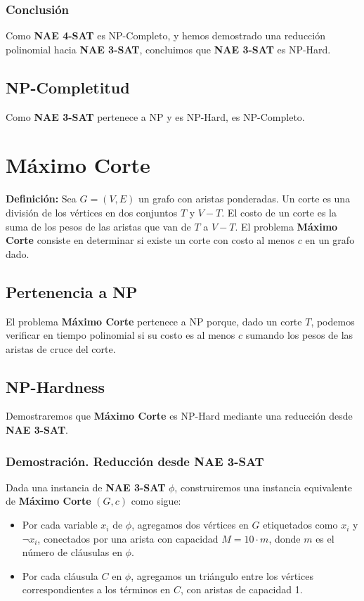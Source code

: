\documentclass[a4paper,12pt]{article}
\begin{document}
\subsubsection{Conclusi\'on}
Como \textbf{NAE 4-SAT} es NP-Completo, y hemos demostrado una reducci\'on polinomial hacia \textbf{NAE 3-SAT}, concluimos que \textbf{NAE 3-SAT} es NP-Hard. 

\subsection{NP-Completitud}
Como \textbf{NAE 3-SAT} pertenece a NP y es NP-Hard, es NP-Completo.

\section{Máximo Corte}

\textbf{Definici\'on:} Sea $G = (V, E)$ un grafo con aristas ponderadas. Un corte es una divisi\'on de los v\'ertices en dos conjuntos $T$ y $V - T$. El costo de un corte es la suma de los pesos de las aristas que van de $T$ a $V - T$. El problema \textbf{Máximo Corte} consiste en determinar si existe un corte con costo al menos $c$ en un grafo dado.

\subsection{Pertenencia a NP}

El problema \textbf{Máximo Corte} pertenece a NP porque, dado un corte $T$, podemos verificar en tiempo polinomial si su costo es al menos $c$ sumando los pesos de las aristas de cruce del corte.

\subsection{NP-Hardness}

Demostraremos que \textbf{Máximo Corte} es NP-Hard mediante una reducci\'on desde \textbf{NAE 3-SAT}.

\subsubsection{Demostraci\'on. Reducción desde NAE 3-SAT}
Dada una instancia de \textbf{NAE 3-SAT} $\phi$, construiremos una instancia equivalente de \textbf{Máximo Corte} $(G, c)$ como sigue:
\begin{itemize}
    \item Por cada variable $x_i$ de $\phi$, agregamos dos v\'ertices en $G$ etiquetados como $x_i$ y $\neg x_i$, conectados por una arista con capacidad $M = 10 \cdot m$, donde $m$ es el n\'umero de cl\'ausulas en $\phi$.
    \item Por cada cl\'ausula $C$ en $\phi$, agregamos un tri\'angulo entre los v\'ertices correspondientes a los t\'erminos en $C$, con aristas de capacidad 1.
\end{itemize}
\end{document}
